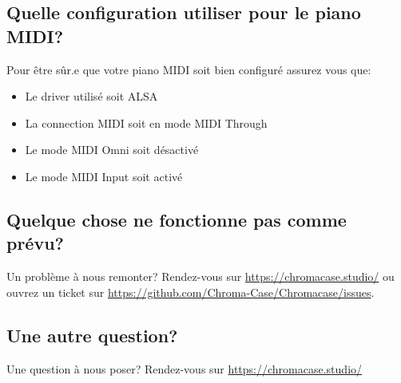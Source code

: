\subsection{Quelle configuration utiliser pour le piano MIDI?}
Pour être sûr.e que votre piano MIDI soit bien configuré assurez vous que:
\begin{itemize}
	\item Le driver utilisé soit ALSA
	\item La connection MIDI soit en mode MIDI Through
	\item Le mode MIDI Omni soit désactivé
	\item Le mode MIDI Input soit activé
\end{itemize}


\subsection{Quelque chose ne fonctionne pas comme prévu?}
Un problème à nous remonter? Rendez-vous sur \url{https://chromacase.studio/} ou ouvrez un ticket sur \url{https://github.com/Chroma-Case/Chromacase/issues}.


\subsection{Une autre question?}
Une question à nous poser? Rendez-vous sur \url{https://chromacase.studio/}
